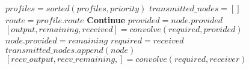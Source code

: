\documentclass{standalone}
\begin{document}
\begin{varwidth}{\linewidth}
\par\noindent
 \begin{algorithmic}[1]
   \State $profiles = sorted(profiles,priority)$
   \State $transmitted\_nodes = []$
   \State $route = profile.route$
   \State \textbf{Continue}
   \EndIf
   \State $provided = node.provided$
   \State $[output, remaining, received] = convolve(required, provided)$
   \State $node.provided = remaining$
   \State $required = received$
   \State $transmitted\_nodes.append(node)$
   \EndFor
   \State $[recv\_output, recv\_remaining, ] = convolve(required, receiver)$
   \EndFor
   \EndFor
   \EndProcedure
 \end{algorithmic}
\end{varwidth}
\end{document}
